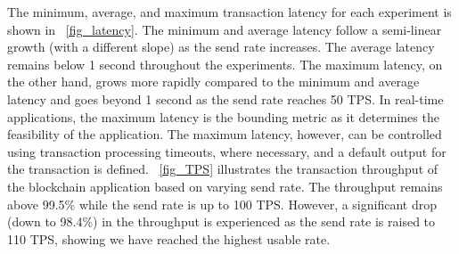 


The minimum, average, and maximum transaction latency for each experiment is shown in \figureautorefname~\ref{fig_latency}. The minimum and average latency follow a semi-linear growth (with a different slope) as the send rate increases. The average latency remains below 1 second throughout the experiments. The maximum latency, on the other hand, grows more rapidly compared to the minimum and average latency and goes beyond 1 second as the send rate reaches 50 \ac{TPS}. In real-time applications, the maximum latency is the bounding metric as it determines the feasibility of the application. The maximum latency, however, can be controlled using transaction processing timeouts, where necessary, and a default output for the transaction is defined. \figureautorefname~\ref{fig_TPS} illustrates the transaction throughput of the blockchain application based on varying send rate. The throughput remains above 99.5\% while the send rate is up to 100 \ac{TPS}. However, a significant drop (down to 98.4\%) in the throughput is experienced as the send rate is raised to 110 \ac{TPS}, showing we have reached the highest usable rate.


